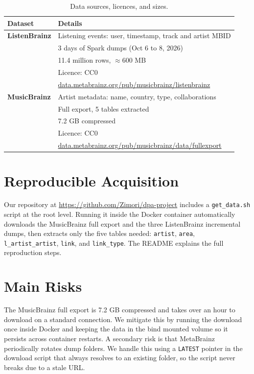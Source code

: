 \documentclass[10pt,a4paper,twocolumn]{article}
\begin{document}
\begin{table}[h]
\centering
\small
\renewcommand{\arraystretch}{1.4}
\begin{tabularx}{\columnwidth}{>{\bfseries}p{1.8cm} X}
\toprule
Dataset & Details \\
\midrule
ListenBrainz
    & Listening events: user, timestamp, track and artist MBID \\
    & 3 days of Spark dumps (Oct 6 to 8, 2026) \\
    & 11.4 million rows, $\approx$600 MB \\
    & Licence: CC0 \\
    & \href{https://data.metabrainz.org/pub/musicbrainz/listenbrainz}{data.metabrainz.org/pub/musicbrainz/listenbrainz} \\
\addlinespace
MusicBrainz
    & Artist metadata: name, country, type, collaborations \\
    & Full export, 5 tables extracted \\
    & 7.2 GB compressed \\
    & Licence: CC0 \\
    & \href{https://data.metabrainz.org/pub/musicbrainz/data/fullexport}{data.metabrainz.org/pub/musicbrainz/data/fullexport} \\
\bottomrule
\end{tabularx}
\caption{Data sources, licences, and sizes.}
\end{table}

\newpage
\section{Reproducible Acquisition}

Our repository at \url{https://github.com/Zimori/dpa-project} includes a \texttt{get\_data.sh} script at the root level. Running it inside the Docker container automatically downloads the MusicBrainz full export and the three ListenBrainz incremental dumps, then extracts only the five tables needed: \texttt{artist}, \texttt{area}, \texttt{l\_artist\_artist}, \texttt{link}, and \texttt{link\_type}. The README explains the full reproduction steps.

\section{Main Risks}

The MusicBrainz full export is 7.2 GB compressed and takes over an hour to download on a standard connection. We mitigate this by running the download once inside Docker and keeping the data in the bind mounted volume so it persists across container restarts. A secondary risk is that MetaBrainz periodically rotates dump folders. We handle this using a \texttt{LATEST} pointer in the download script that always resolves to an existing folder, so the script never breaks due to a stale URL.
\end{document}
